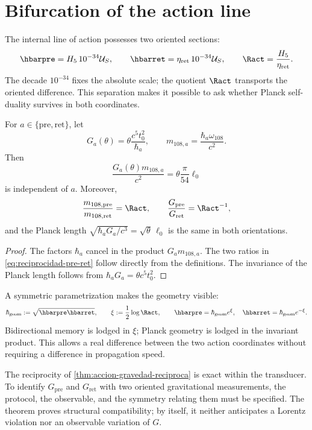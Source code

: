 \section{Bifurcation of the action line}

The internal line of action possesses two oriented sections:
\begin{equation}
\hbarpre=H_5\,10^{-34}\mathcal U_S,
\qquad
\hbarret=\eta_{\mathrm{ret}}\,10^{-34}\mathcal U_S,
\qquad
\Ract=\frac{H_5}{\eta_{\mathrm{ret}}}.
\label{eq:hbar-pre-ret-anexo}
\end{equation}
The decade \(10^{-34}\) fixes the absolute scale; the quotient \(\Ract\)
transports the oriented difference. This separation makes it possible to ask whether
Planck self-duality survives in both coordinates.

\begin{theorem}
\label{thm:accion-gravedad-reciproca}
For \(a\in\{\mathrm{pre},\mathrm{ret}\}\), let
\[
G_a(\theta)=\theta\frac{c^5t_0^2}{\hbar_a},
\qquad
m_{108,a}=\frac{\hbar_a\omega_{108}}{c^2}.
\]
Then
\begin{equation}
\frac{G_a(\theta)m_{108,a}}{c^2}
=\theta\frac{\pi}{54}\ell_0
\label{eq:invariante-pre-ret-planck}
\end{equation}
is independent of \(a\). Moreover,
\begin{equation}
\frac{m_{108,\mathrm{pre}}}{m_{108,\mathrm{ret}}}=\Ract,
\qquad
\frac{G_{\mathrm{pre}}}{G_{\mathrm{ret}}}=\Ract^{-1},
\label{eq:reciprocidad-pre-ret}
\end{equation}
and the Planck length
\(\sqrt{\hbar_aG_a/c^3}=\sqrt\theta\,\ell_0\) is the same in both
orientations.
\end{theorem}

\begin{proof}
The factors \(\hbar_a\) cancel in the product \(G_am_{108,a}\).
The two ratios in \eqref{eq:reciprocidad-pre-ret} follow directly
from the definitions. The invariance of the Planck length follows from
\(\hbar_aG_a=\theta c^5t_0^2\).
\end{proof}

A symmetric parametrization makes the geometry visible:
\begin{equation}
\hbar_{\mathrm{geom}}:=\sqrt{\hbarpre\hbarret},
\qquad
\xi:=\frac12\log\Ract,
\qquad
\hbarpre=\hbar_{\mathrm{geom}}e^\xi,
\quad
\hbarret=\hbar_{\mathrm{geom}}e^{-\xi}.
\label{eq:rapidez-accion-pre-ret}
\end{equation}
Bidirectional memory is lodged in \(\xi\); Planck geometry is
lodged in the invariant product. This allows a real difference between the
two action coordinates without requiring a difference in
propagation speed.

\begin{remark}
The reciprocity of \cref{thm:accion-gravedad-reciproca} is exact within the transducer. To identify \(G_{\mathrm{pre}}\) and \(G_{\mathrm{ret}}\) with two oriented gravitational measurements, the protocol, the observable, and the symmetry relating them must be specified. The theorem proves structural compatibility; by itself, it neither anticipates a Lorentz violation nor an observable variation of \(G\).
\end{remark}
